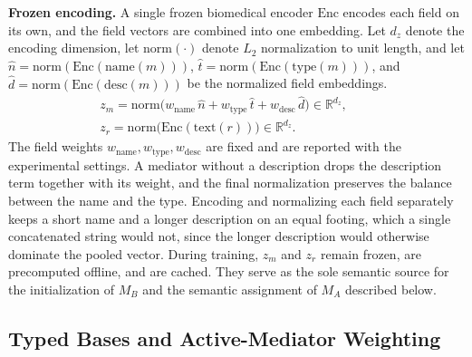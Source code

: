 \documentclass[letterpaper]{article} %
\begin{document}
\textbf{Frozen encoding.} A single frozen biomedical encoder $\mathrm{Enc}$ encodes each field on its own, and the field vectors are combined into one embedding. Let $d_z$ denote the encoding dimension, let $\mathrm{norm}(\cdot)$ denote $L_2$ normalization to unit length, and let $\hat n = \mathrm{norm}(\mathrm{Enc}(\mathrm{name}(m)))$, $\hat t = \mathrm{norm}(\mathrm{Enc}(\mathrm{type}(m)))$, and $\hat d = \mathrm{norm}(\mathrm{Enc}(\mathrm{desc}(m)))$ be the normalized field embeddings.
\begin{equation}
\begin{array}{c}
z_m = \mathrm{norm}\big(w_{\mathrm{name}}\,\hat n + w_{\mathrm{type}}\,\hat t + w_{\mathrm{desc}}\,\hat d\big)\in\mathbb{R}^{d_z},\qquad \\
z_r = \mathrm{norm}\big(\mathrm{Enc}(\mathrm{text}(r))\big)\in\mathbb{R}^{d_z}.
\end{array}
\end{equation}
The field weights $w_{\mathrm{name}}, w_{\mathrm{type}}, w_{\mathrm{desc}}$ are fixed and are reported with the experimental settings. A mediator without a description drops the description term together with its weight, and the final normalization preserves the balance between the name and the type. Encoding and normalizing each field separately keeps a short name and a longer description on an equal footing, which a single concatenated string would not, since the longer description would otherwise dominate the pooled vector. During training, $z_m$ and $z_r$ remain frozen, are precomputed offline, and are cached. They serve as the sole semantic source for the initialization of $M_B$ and the semantic assignment of $M_A$ described below.

\begin{center}
\end{center}

\subsection{Typed Bases and Active-Mediator Weighting}
\end{document}
